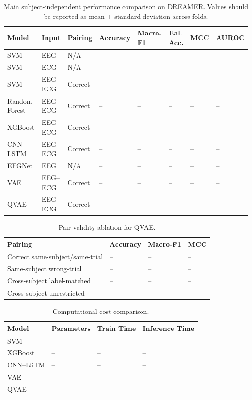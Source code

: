 
\begin{table}[!t]
\centering
\caption{Main subject-independent performance comparison on DREAMER. Values should be reported as mean $\pm$ standard deviation across folds.}
\label{tab:dreamer_main_results}
\begin{tabular}{llllllll}
\toprule
Model & Input & Pairing & Accuracy & Macro-F1 & Bal. Acc. & MCC & AUROC \\
\midrule
SVM & EEG & N/A & -- & -- & -- & -- & -- \\
SVM & ECG & N/A & -- & -- & -- & -- & -- \\
SVM & EEG--ECG & Correct & -- & -- & -- & -- & -- \\
Random Forest & EEG--ECG & Correct & -- & -- & -- & -- & -- \\
XGBoost & EEG--ECG & Correct & -- & -- & -- & -- & -- \\
CNN--LSTM & EEG--ECG & Correct & -- & -- & -- & -- & -- \\
EEGNet & EEG & N/A & -- & -- & -- & -- & -- \\
VAE & EEG--ECG & Correct & -- & -- & -- & -- & -- \\
QVAE & EEG--ECG & Correct & -- & -- & -- & -- & -- \\
\bottomrule
\end{tabular}
\end{table}

\begin{table}[!t]
\centering
\caption{Pair-validity ablation for QVAE.}
\label{tab:qvae_pair_validity}
\begin{tabular}{llll}
\toprule
Pairing & Accuracy & Macro-F1 & MCC \\
\midrule
Correct same-subject/same-trial & -- & -- & -- \\
Same-subject wrong-trial & -- & -- & -- \\
Cross-subject label-matched & -- & -- & -- \\
Cross-subject unrestricted & -- & -- & -- \\
\bottomrule
\end{tabular}
\end{table}

\begin{table}[!t]
\centering
\caption{Computational cost comparison.}
\label{tab:compute_cost}
\begin{tabular}{llll}
\toprule
Model & Parameters & Train Time & Inference Time \\
\midrule
SVM & -- & -- & -- \\
XGBoost & -- & -- & -- \\
CNN--LSTM & -- & -- & -- \\
VAE & -- & -- & -- \\
QVAE & -- & -- & -- \\
\bottomrule
\end{tabular}
\end{table}

